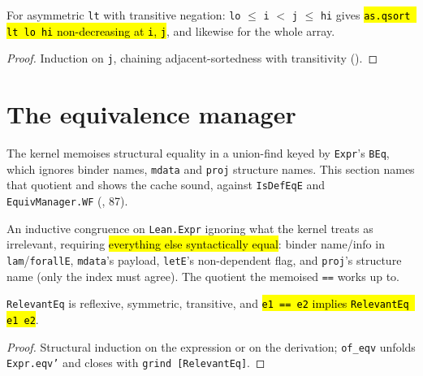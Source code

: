 \begin{theorem}
\label{thm:qsort-sorted}
\leanok
{}

 For asymmetric \texttt{lt} with transitive negation: \texttt{lo} $\le$ \texttt{i} $<$
\texttt{j} $\le$ \texttt{hi} gives \hl{\texttt{as.qsort lt lo hi} non-decreasing at \texttt{i}, \texttt{j}},
and likewise for the whole array.
\end{theorem}
\begin{proof}
\leanok
{} Induction on \texttt{j}, chaining adjacent-sortedness with transitivity
().
\end{proof}

\section{The equivalence manager}

The kernel memoises structural equality in a union-find keyed by \texttt{Expr}'s \texttt{BEq}, which
ignores binder names, \texttt{mdata} and \texttt{proj} structure names. This section names that
quotient and shows the cache sound, against \texttt{IsDefEqE} and \texttt{EquivManager.WF}
(, {87}).

\begin{definition}
\label{ind:eqvmgr-relevanteq}
\leanok
{}

 An inductive congruence on \texttt{Lean.Expr} ignoring what the kernel treats as
irrelevant, requiring \hl{everything else syntactically equal}: binder name/info in
\texttt{lam}/\texttt{forallE}, \texttt{mdata}'s payload, \texttt{letE}'s non-dependent flag, and
\texttt{proj}'s structure name (only the index must agree). The quotient the memoised \texttt{==}
works up to.
\end{definition}

\begin{lemma}
\label{fam:eqvmgr-relevanteq-lemmas}
\leanok
{}

 \texttt{RelevantEq} is reflexive, symmetric, transitive, and \hl{\texttt{e1 == e2}
implies \texttt{RelevantEq e1 e2}}.
\end{lemma}
\begin{proof}
\leanok
{} Structural induction on the expression or on the derivation; \texttt{of\_eqv} unfolds
\texttt{Expr.eqv'} and closes with \texttt{grind [RelevantEq]}.
\end{proof}

